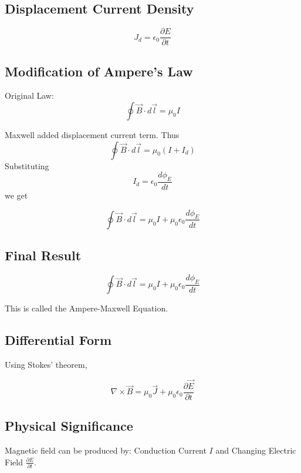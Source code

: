 \documentclass[11pt,a4paper]{article}
\begin{document}
\subsection*{Displacement Current Density}
\begin{tcolorbox}[colback=RoyalBlue!5!white, colframe=RoyalBlue]
    \[ J_d = \epsilon_0 \frac{\partial E}{\partial t} \]
\end{tcolorbox}

\subsection*{Modification of Ampere's Law}
Original Law:
\[ \oint \vec{B} \cdot d\vec{l} = \mu_0 I \]

Maxwell added displacement current term. Thus
\[ \oint \vec{B} \cdot d\vec{l} = \mu_0(I + I_d) \]
Substituting
\[ I_d = \epsilon_0 \frac{d\phi_E}{dt} \]
we get
\begin{tcolorbox}[colback=RoyalBlue!5!white, colframe=RoyalBlue]
    \[ \oint \vec{B} \cdot d\vec{l} = \mu_0 I + \mu_0\epsilon_0\frac{d\phi_E}{dt} \]
\end{tcolorbox}

\subsection*{Final Result}
\begin{tcolorbox}[colback=RoyalBlue!5!white, colframe=RoyalBlue]
    \[ \oint \vec{B} \cdot d\vec{l} = \mu_0 I + \mu_0\epsilon_0\frac{d\phi_E}{dt} \]
\end{tcolorbox}
This is called the Ampere-Maxwell Equation.

\subsection*{Differential Form}
Using Stokes' theorem,
\begin{tcolorbox}[colback=RoyalBlue!5!white, colframe=RoyalBlue]
    \[ \nabla \times \vec{B} = \mu_0\vec{J} + \mu_0\epsilon_0\frac{\partial\vec{E}}{\partial t} \]
\end{tcolorbox}

\subsection*{Physical Significance}
Magnetic field can be produced by:
Conduction Current \( I \) and Changing Electric Field \( \frac{\partial E}{\partial t} \).
\end{document}
